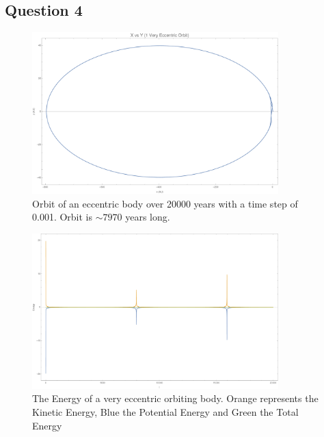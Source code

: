 \documentclass{article}
\begin{document}
\pagebreak
\subsection{Question 4}

\begin{figure}[!htb]
	\begin{center}
		\includegraphics[width=0.85\textwidth]{veo3.pdf}
	\end{center}
	\caption{Orbit of an eccentric body over 20000 years with a time step of 0.001. Orbit is $\sim7970$ years long.}
	\label{fig:veo3}
\end{figure}
\FloatBarrier



\begin{figure}[!htb]
	\begin{center}
		\includegraphics[width=0.85\textwidth]{veccenergy.pdf}
	\end{center}
	\caption{The Energy of a very eccentric orbiting body. Orange represents the Kinetic Energy, Blue the Potential Energy and Green the Total Energy}
	\label{fig:vee}
\end{figure}
\FloatBarrier
\end{document}
